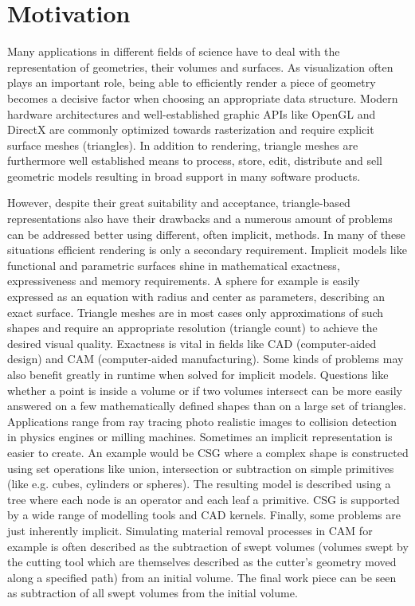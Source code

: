 
 
\section{Motivation}

Many applications in different fields of science have to deal with the representation of geometries, their volumes and surfaces. As visualization often plays an important role, being able to efficiently render a piece of geometry becomes a decisive factor when choosing an appropriate data structure. Modern hardware architectures and well-established graphic APIs like OpenGL and DirectX are commonly optimized towards rasterization and require explicit surface meshes (\ie triangles). In addition to rendering, triangle meshes are furthermore well established means to process, store, edit, distribute and sell geometric models resulting in broad support in many software products.

However, despite their great suitability and acceptance, triangle-based representations also have their drawbacks and a numerous amount of problems can be addressed better using different, often implicit, methods. In many of these situations efficient rendering is only a secondary requirement. Implicit models like functional and parametric surfaces shine in mathematical exactness, expressiveness and memory requirements. A sphere for example is easily expressed as an equation with radius and center as parameters, describing an exact surface. Triangle meshes are in most cases only approximations of such shapes and require an appropriate resolution (\ie triangle count) to achieve the desired visual quality. Exactness is vital in fields like CAD (computer-aided design) and CAM (computer-aided manufacturing).
Some kinds of problems may also benefit greatly in runtime when solved for implicit models. Questions like whether a point is inside a volume or if two volumes intersect can be more easily answered on a few mathematically defined shapes than on a large set of triangles. Applications range from ray tracing photo realistic images to collision detection in physics engines or milling machines. 
Sometimes an implicit representation is easier to create. An example would be CSG where a complex shape is constructed using set operations like union, intersection or subtraction on simple primitives (like e.g. cubes, cylinders or spheres). The resulting model is described using a tree where each node is an operator and each leaf a primitive. CSG is supported by a wide range of modelling tools and CAD kernels.
Finally, some problems are just inherently implicit. Simulating material removal processes in CAM for example is often described as the subtraction of swept volumes (volumes swept by the cutting tool which are themselves described as the cutter's geometry moved along a specified path) from an initial volume. The final work piece can be seen as subtraction of all swept volumes from the initial volume.


